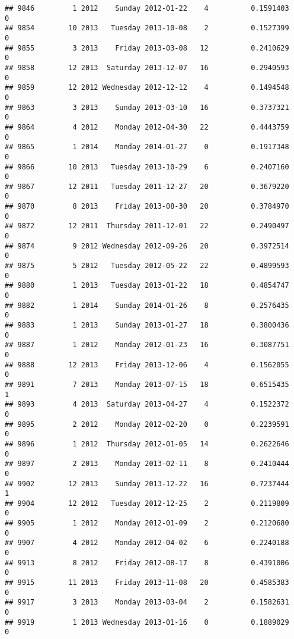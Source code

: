 \documentclass[
]{article}
\begin{document}
\begin{verbatim}
## 9846         1 2012    Sunday 2012-01-22    4          0.1591403             0
## 9854        10 2013   Tuesday 2013-10-08    2          0.1527399             0
## 9855         3 2013    Friday 2013-03-08   12          0.2410629             0
## 9858        12 2013  Saturday 2013-12-07   16          0.2940593             0
## 9859        12 2012 Wednesday 2012-12-12    4          0.1494548             0
## 9863         3 2013    Sunday 2013-03-10   16          0.3737321             0
## 9864         4 2012    Monday 2012-04-30   22          0.4443759             0
## 9865         1 2014    Monday 2014-01-27    0          0.1917348             0
## 9866        10 2013   Tuesday 2013-10-29    6          0.2407160             0
## 9867        12 2011   Tuesday 2011-12-27   20          0.3679220             0
## 9870         8 2013    Friday 2013-08-30   20          0.3784970             0
## 9872        12 2011  Thursday 2011-12-01   22          0.2490497             0
## 9874         9 2012 Wednesday 2012-09-26   20          0.3972514             0
## 9875         5 2012   Tuesday 2012-05-22   22          0.4899593             0
## 9880         1 2013   Tuesday 2013-01-22   18          0.4854747             0
## 9882         1 2014    Sunday 2014-01-26    8          0.2576435             0
## 9883         1 2013    Sunday 2013-01-27   18          0.3800436             0
## 9887         1 2012    Monday 2012-01-23   16          0.3087751             0
## 9888        12 2013    Friday 2013-12-06    4          0.1562055             0
## 9891         7 2013    Monday 2013-07-15   18          0.6515435             1
## 9893         4 2013  Saturday 2013-04-27    4          0.1522372             0
## 9895         2 2012    Monday 2012-02-20    0          0.2239591             0
## 9896         1 2012  Thursday 2012-01-05   14          0.2622646             0
## 9897         2 2013    Monday 2013-02-11    8          0.2410444             0
## 9902        12 2013    Sunday 2013-12-22   16          0.7237444             1
## 9904        12 2012   Tuesday 2012-12-25    2          0.2119809             0
## 9905         1 2012    Monday 2012-01-09    2          0.2120680             0
## 9907         4 2012    Monday 2012-04-02    6          0.2240188             0
## 9913         8 2012    Friday 2012-08-17    8          0.4391006             0
## 9915        11 2013    Friday 2013-11-08   20          0.4585383             0
## 9917         3 2013    Monday 2013-03-04    2          0.1582631             0
## 9919         1 2013 Wednesday 2013-01-16    0          0.1889029             0

\end{verbatim}
\end{document}
